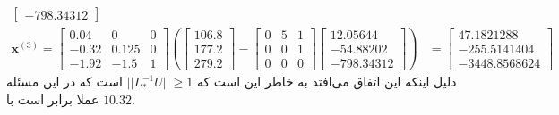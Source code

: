 \documentclass[]{article}
\begin{document}
\begin{align*}
\begin{bmatrix}
        -798.34312
    \end{bmatrix}\\
    \mathbf{x}^{(3)} = \begin{bmatrix}
        0.04 & 0 & 0\\
        -0.32 & 0.125 & 0\\
        -1.92 & -1.5 & 1
    \end{bmatrix} \left(\begin{bmatrix}
        106.8\\
        177.2\\
        279.2
    \end{bmatrix} - \begin{bmatrix}
        0 & 5 & 1\\
        0 & 0 & 1\\
        0 & 0 & 0
    \end{bmatrix}\begin{bmatrix}
        12.05644\\
        -54.88202\\
        -798.34312
    \end{bmatrix}\right)
    &=
    \begin{bmatrix}
        47.1821288\\
        -255.5141404\\
        -3448.8568624
    \end{bmatrix}
\end{align*}
دلیل اینکه این اتفاق می‌افتد به خاطر این است که
$||L_*^{-1} U|| \ge 1$
است که در این مسئله عملا برابر است با
$10.32$.
\end{document}
